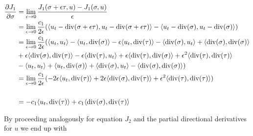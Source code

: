 \documentclass[../draft_1.tex]{subfiles}
\begin{document}
\begin{equation}
\begin{aligned}
\frac{\partial J_1}{\partial \sigma} &= \lim_{\epsilon \rightarrow 0} \frac{J_1(\sigma + \epsilon \tau, u) - J_1(\sigma, u)}{\epsilon}  \\ 
&= \lim_{\epsilon \rightarrow 0} \frac{c_1}{2 \epsilon} (\langle u_t - \di(\sigma + \epsilon \tau), u_t - \di(\sigma + \epsilon \tau) \rangle - \langle u_t - \di(\sigma), u_t - \di(\sigma) \rangle) \\
&=  \lim_{\epsilon \rightarrow 0} \frac{c_1}{2 \epsilon} (\langle u_t, u_t \rangle - \langle u_t, \di(\sigma) \rangle - \epsilon \langle u_t, \di(\tau) \rangle - \langle \di(\sigma), u_t \rangle + \langle \di(\sigma), \di(\sigma) \rangle \\ &+ \epsilon \langle \di(\sigma), \di(\tau) \rangle - \epsilon \langle \di(\tau), u_t \rangle + \epsilon \langle \di(\tau), \di(\sigma) \rangle + \epsilon^2 \langle \di(\tau), \di(\tau) \rangle \\
& - \langle u_t, u_t \rangle + \langle u_t, \di(\sigma) \rangle + \langle \di(\sigma), u_t \rangle - \langle \di(\sigma), \di(\sigma) \rangle) \\
&= \lim_{\epsilon \rightarrow 0} \frac{c_1}{2 \epsilon} (- 2 \epsilon \langle u_t, \di(\tau) \rangle + 2 \epsilon \langle \di(\sigma), \di(\tau) \rangle + \epsilon^2 \langle \di(\tau), \di(\tau) \rangle )
\\
\\
&= - c_1 \langle u_t, \di(\tau) \rangle + c_1 \langle \di(\sigma), \di(\tau) \rangle
\end{aligned}
\end{equation}

By proceeding analogously for equation $J_2$ and the partial directional derivatives for $u$ we end up with
\end{document}
